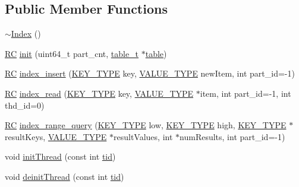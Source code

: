 \subsection*{Public Member Functions}
\begin{DoxyCompactItemize}
\item 
\hyperlink{classIndex_a76b7ed4e9cb0b1540264567f84896032}{$\sim$\+Index} ()
\item 
\hyperlink{global_8h_a78c49a674c810fdd03d20432f7be864a}{RC} \hyperlink{classIndex_a1328ba545ab4ef6750a742f0de084d79}{init} (uint64\+\_\+t part\+\_\+cnt, \hyperlink{classtable__t}{table\+\_\+t} $\ast$\hyperlink{classindex__base_abb51a82fc0bf85a82aa83376d111641f}{table})
\item 
\hyperlink{global_8h_a78c49a674c810fdd03d20432f7be864a}{RC} \hyperlink{classIndex_a2266050deae0c62e0b90e7d60fd70f35}{index\+\_\+insert} (\hyperlink{index__base_8h_ae35c40bc2f912c11f0e36ac66cba4489}{K\+E\+Y\+\_\+\+T\+Y\+PE} key, \hyperlink{microbench_2main_8cpp_ae17cb099b4c9aee7835032339b5a9e0d}{V\+A\+L\+U\+E\+\_\+\+T\+Y\+PE} new\+Item, int part\+\_\+id=-\/1)
\item 
\hyperlink{global_8h_a78c49a674c810fdd03d20432f7be864a}{RC} \hyperlink{classIndex_abb1666dd897887f22d8e4dc92966b207}{index\+\_\+read} (\hyperlink{index__base_8h_ae35c40bc2f912c11f0e36ac66cba4489}{K\+E\+Y\+\_\+\+T\+Y\+PE} key, \hyperlink{microbench_2main_8cpp_ae17cb099b4c9aee7835032339b5a9e0d}{V\+A\+L\+U\+E\+\_\+\+T\+Y\+PE} $\ast$item, int part\+\_\+id=-\/1, int thd\+\_\+id=0)
\item 
\hyperlink{global_8h_a78c49a674c810fdd03d20432f7be864a}{RC} \hyperlink{classIndex_a5e3d8773117cba2f8dc644185d560a0c}{index\+\_\+range\+\_\+query} (\hyperlink{index__base_8h_ae35c40bc2f912c11f0e36ac66cba4489}{K\+E\+Y\+\_\+\+T\+Y\+PE} low, \hyperlink{index__base_8h_ae35c40bc2f912c11f0e36ac66cba4489}{K\+E\+Y\+\_\+\+T\+Y\+PE} high, \hyperlink{index__base_8h_ae35c40bc2f912c11f0e36ac66cba4489}{K\+E\+Y\+\_\+\+T\+Y\+PE} $\ast$result\+Keys, \hyperlink{microbench_2main_8cpp_ae17cb099b4c9aee7835032339b5a9e0d}{V\+A\+L\+U\+E\+\_\+\+T\+Y\+PE} $\ast$result\+Values, int $\ast$num\+Results, int part\+\_\+id=-\/1)
\item 
void \hyperlink{classIndex_a6a509df225912ffea8547fa0daa57d8c}{init\+Thread} (const int \hyperlink{microbench_2main_8cpp_a9ca9869868fe7e7a38a921cc7de4103f}{tid})
\item 
void \hyperlink{classIndex_a62ecc92aa23b7292ea6735ff9ac21c80}{deinit\+Thread} (const int \hyperlink{microbench_2main_8cpp_a9ca9869868fe7e7a38a921cc7de4103f}{tid})

\end{DoxyCompactItemize}

